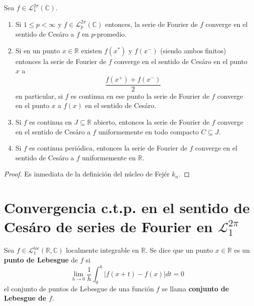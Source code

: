 \documentclass[12pt]{report}
\theoremstyle{largebreak}
\newcommand\abs[1]{\ensuremath{\left|#1\right|}}
\begin{document}
    \begin{theor}
        Sea $f\in\mathcal{L}_1^{2\pi}(\mathbb{C})$.
        \begin{enumerate}
            \item Si $1\leq p<\infty$ y $f\in\mathcal{L}_p^{2\pi}(\mathbb{C})$ entonces, la serie de Fourier de $f$ converge en el sentido de Cesáro a $f$ en $p$-promedio.
            \item Si en un punto $x\in\mathbb{R}$ existen $f(x^*)$ y $f(x^-)$ (siendo ambos finitos) entonces la serie de Fourier de $f$ converge en el sentido de Cesáro en el punto $x$ a
            \begin{equation*}
                \frac{f(x^+)+f(x^-)}{2}
            \end{equation*}
            en particular, si $f$ es continua en ese punto la serie de Fourier de $f$ converge en el punto $x$ a $f(x)$ en el sentido de Cesáro.
            \item Si $f$ es continua en $J\subseteq\mathbb{R}$ abierto, entonces la serie de Fourier de $f$ converge en el sentido de Cesáro a $f$ uniformemente en todo compacto $C\subseteq J$.
            \item Si $f$ es continua periódica, entonces la serie de Fourier de $f$ converge en el sentido de Cesáro a $f$ uniformemente en $\mathbb{R}$.
        \end{enumerate}
    \end{theor}

    \begin{proof}
        Es inmediata de la definición del núcleo de Fejér $k_n$.
    \end{proof}

    \section{Convergencia c.t.p. en el sentido de Cesáro de series de Fourier en $\mathcal{L}_1^{2\pi}$}

    \begin{mydef}
        Sea $f\in\mathcal{L}_1^{loc}(\mathbb{R},\mathbb{C})$ localmente integrable en $\mathbb{R}$. Se dice que un punto $x\in\mathbb{R}$ es un \textbf{punto de Lebesgue} de $f$ si
        \begin{equation*}
            \lim_{ h\rightarrow 0}\frac{1}{h}\int_0^h\abs{f(x+t)-f(x)}dt=0
        \end{equation*}
        el conjunto de puntos de Lebesgue de una función $f$ se llama \textbf{conjunto de Lebesgue de $f$}.
    \end{mydef}
\end{document}
